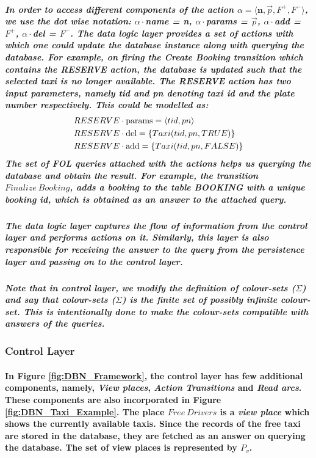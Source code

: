 \subparagraph*{\textnormal{In order to access different components of the action $\mathit{\alpha = \langle \textbf{n},\vec{p},F^{+},F^{-}\rangle}$, we use the dot wise notation: $\mathit{\alpha\cdot}$name = \textbf{n}, $\mathit{\alpha\cdot}$params = $\mathit{\vec{p}}$, $\mathit{\alpha\cdot}$add = $\mathit{F^{+}}$, $\mathit{\alpha\cdot}$del = $\mathit{F^{-}}$. The data logic layer provides a set of actions with which one could update the database instance along with querying the database. For example, on firing the \textit{Create Booking} transition which contains the \textit{RESERVE} action, the database is updated such that the selected taxi is no longer available. The \textit{RESERVE} action has two input parameters, namely \textit{tid} and \textit{pn} denoting taxi id and the plate number respectively. This could be modelled as:
\begin{equation*}
\begin{aligned}
&RESERVE\cdot\textnormal{params} = \langle tid,pn \rangle \\
&RESERVE\cdot\textnormal{del} = \{Taxi(tid,pn,TRUE)\} \\
&RESERVE\cdot\textnormal{add} = \{Taxi(tid,pn,FALSE)\} \\
\end{aligned}
\end{equation*}
The set of FOL queries attached with the actions helps us querying the database and obtain the result. For example, the transition $\mathit{Finalize\ Booking}$, adds a booking to the table \textit{BOOKING} with a unique booking id, which is obtained as an answer to the attached query.}}

\subparagraph*{\textnormal{The data logic layer captures the flow of information from the control layer and performs actions on it. Similarly, this layer is also responsible for receiving the answer to the query from the persistence layer and passing on to the control layer.}}

\subparagraph*{\textnormal{Note that in control layer, we modify the definition of colour-sets ($\mathit{\Sigma}$) and say that colour-sets ($\mathit{\Sigma}$) is the finite set of possibly infinite colour-set. This is intentionally done to make the colour-sets compatible with answers of the queries.}}

\subsubsection{Control Layer}
\paragraph*{\textnormal{ In Figure \ref{fig:DBN_Framework}, the control layer has few additional components, namely, \textit{View places}, \textit{Action Transitions} and \textit{Read arcs}. These components are also incorporated in Figure \ref{fig:DBN_Taxi_Example}. The place $\mathit{Free\ Drivers}$ is a \textit{view place} which shows the currently available taxis. Since the records of the free taxi are stored in the database, they are fetched as an answer on querying the database. The set of view places is represented by $\mathit{P_{v}}$.}}


